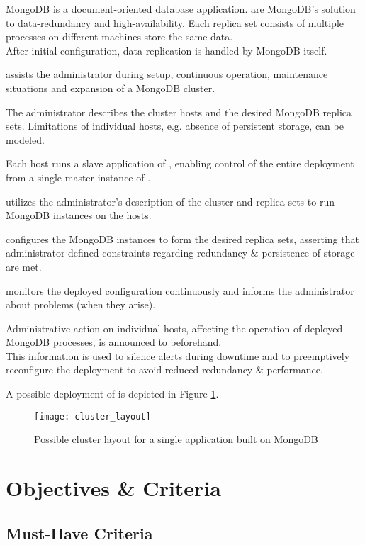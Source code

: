 \documentclass[a4paper, 11pt]{article}
\let\oldsection\section
\renewcommand\section{\clearpage\oldsection}
\begin{document}
\gls{MongoDB} is a document-oriented database application.  are MongoDB's solution to data-redundancy and high-availability. Each replica set consists of multiple processes on different machines store the same data.\\
After initial configuration, data replication is handled by MongoDB itself.

\mamid assists the \gls{administrator} during setup, continuous operation, maintenance situations and expansion of a \gls{MongoDB} cluster.

The \gls{administrator} describes the cluster \glspl{host} and the desired \gls{MongoDB} \glspl{replica set}.
Limitations of individual hosts, e.g. absence of persistent storage, can be modeled.

Each \gls{host} runs a \gls{slave} application of \mamid, enabling control of the entire deployment from a single \gls{master} instance of \mamid.

\mamid utilizes the \gls{administrator}'s description of the cluster and replica sets to run \gls{MongoDB} instances on the \glspl{host}.

\mamid configures the \gls{MongoDB} instances to form the desired replica sets, asserting that administrator-defined constraints regarding redundancy \& persistence of storage are met.

\mamid monitors the deployed configuration continuously and informs the \gls{administrator} about problems (when they arise).

Administrative action on individual hosts, affecting the operation of deployed MongoDB processes, is announced to \mamid beforehand.\\
This information is used to silence alerts during downtime and to preemptively reconfigure the deployment to avoid reduced redundancy \& performance.

A possible deployment of \mamid is depicted in Figure \ref{fig:cluster_layout}.

\begin{figure}[H]
	\centering
	\texttt{[image: cluster\_layout]}
	\caption{Possible cluster layout for a single application built on MongoDB}
	\label{fig:cluster_layout}
\end{figure}

\section{Objectives \& Criteria}
\subsection{Must-Have Criteria}
\end{document}
